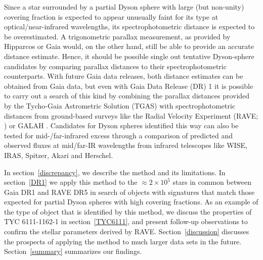 \documentclass[twocolumn]{aastex6}
\begin{document}
Since a star surrounded by a partial Dyson sphere with large (but non-unity) covering fraction is expected to appear unusually faint for its type at optical/near-infrared wavelengths, its spectrophotometric distance is expected to be overestimated. A trigonometric parallax measurement, as provided by Hipparcos or Gaia would, on the other hand, still be able to provide an accurate distance estimate. Hence, it should be possible single out tentative Dyson-sphere candidates by comparing parallax distances to their spectrophotometric counterparts. With future Gaia data releases, both distance estimates can be obtained from Gaia data, but even with Gaia Data Release (DR) 1 \citep{2016A&A...595A...1G} it is possible to carry out a search of this kind by combining the parallax distances provided by the Tycho-Gaia Astrometric Solution (TGAS) with spectrophotometric distances from ground-based surveys like the Radial Velocity Experiment (RAVE; \citealt{Kunder17}) or GALAH \citep{Martell17}. Candidates for Dyson spheres identified this way can also be tested for mid-/far-infrared excess through a comparison of predicted and observed fluxes at mid/far-IR wavelengths from infrared telescopes like WISE, IRAS, Spitzer, Akari and Herschel.

In section~\ref{discrepancy}, we describe the method and its limitations. In section~\ref{DR1} we apply this method to the $\approx 2\times 10^5$ stars in common between Gaia DR1 and RAVE DR5 in search of objects with signatures that match those expected for partial Dyson spheres with high covering fractions. As an example of the type of object that is identified by this method, we discuss the properties of TYC 6111-1162-1 in section~\ref{TYC6111}, and present follow-up observations to confirm the stellar parameters derived by RAVE. Section~\ref{discussion} discusses the prospects of applying the method to much larger data sets in the future. Section~\ref{summary} summarizes our findings.
\end{document}
